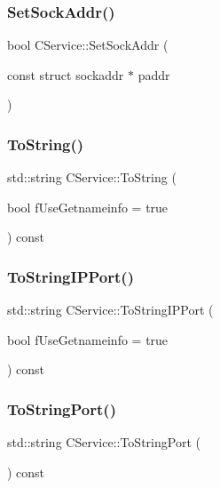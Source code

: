\subsubsection{\texorpdfstring{Set\+Sock\+Addr()}{SetSockAddr()}}
{\footnotesize\ttfamily bool C\+Service\+::\+Set\+Sock\+Addr (\begin{DoxyParamCaption}\item[{const struct sockaddr $\ast$}]{paddr }\end{DoxyParamCaption})}

\mbox{\label{class_c_service_ae274e8b6fc38955d74044d326a405024}} 
\subsubsection{\texorpdfstring{To\+String()}{ToString()}}
{\footnotesize\ttfamily std\+::string C\+Service\+::\+To\+String (\begin{DoxyParamCaption}\item[{bool}]{f\+Use\+Getnameinfo = {\ttfamily true} }\end{DoxyParamCaption}) const}

\mbox{\label{class_c_service_a75b6c84b3184ab809b6dda3576be78ee}} 
\subsubsection{\texorpdfstring{To\+String\+I\+P\+Port()}{ToStringIPPort()}}
{\footnotesize\ttfamily std\+::string C\+Service\+::\+To\+String\+I\+P\+Port (\begin{DoxyParamCaption}\item[{bool}]{f\+Use\+Getnameinfo = {\ttfamily true} }\end{DoxyParamCaption}) const}

\mbox{\label{class_c_service_a95d6f24b6a613fca24734ba4e38ef3dc}} 
\subsubsection{\texorpdfstring{To\+String\+Port()}{ToStringPort()}}
{\footnotesize\ttfamily std\+::string C\+Service\+::\+To\+String\+Port (\begin{DoxyParamCaption}{ }\end{DoxyParamCaption}) const}



